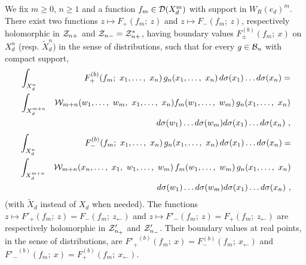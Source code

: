 \documentclass[a4paper,a4paper]{article}
\def\BB{{\cal B}}
\def\DD{{\cal D}}
\def\WW{{\cal W}}
\def\ZZ{{\cal Z}}
\def\wt{\widetilde}
\def\Xdn{X_d^n}
\def\wXdn{{\wt X_d^n}}
\begin{document}
We fix $m \ge 0$, $n \ge 1$ and a function ${f_m}\in \DD(X_d^m)$
with support in $W_R(e_d)^m$. There exist two functions
$z \mapsto F_+({f_m};\ z)$ and $z \mapsto F_-({f_m};\ z)$, respectively
holomorphic in $\ZZ_{n+}$ and $\ZZ_{n-} = \ZZ_{n+}^*$,
having boundary values
$F_{\pm}^{(b)}({f_m};\ x)$ on $\Xdn$ (resp. $\wXdn$)
in the sense of distributions, such that
for every $g \in \BB_n$ with compact support,
\begin{eqnarray}
&\displaystyle\int_{\Xdn}&
F_+^{(b)}({f_m};\ x_1,\ldots,\ x_n)\,{g_n}(x_1,\ldots,\ x_n)\,
d\sigma(x_1)\ldots d\sigma(x_n) =\nonumber\\
&\displaystyle\int_{X_d^{m+n}}&
\WW_{m+n}(w_1,\ldots,\ w_m,\ x_1,\ldots,\ x_n)
{f_m}(w_1,\ldots,\ w_m)\,{g_n}(x_1,\ldots,\ x_n)\nonumber\\
&& d\sigma(w_1)\ldots d\sigma(w_m)d\sigma(x_1)\ldots d\sigma(x_n)\ ,
\label{5.12}\end{eqnarray}
\begin{eqnarray}
&\displaystyle\int_{\Xdn}&
F_-^{(b)}({f_m};\ x_1,\ldots,\ x_n)\,{g_n}(x_1,\ldots,\ x_n)\,
d\sigma(x_1)\ldots d\sigma(x_n) =\nonumber\\
&\displaystyle\int_{X_d^{m+n}}&
\WW_{m+n}(x_n,\ldots,\ x_1,\ w_1,\ldots,\ w_m)\,
{f_m}(w_1,\ldots,\ w_m)\,{g_n}(x_1,\ldots,\ x_n)\nonumber\\
&& d\sigma(w_1)\ldots d\sigma(w_m)d\sigma(x_1)\ldots d\sigma(x_n)\ ,
\label{5.13}\end{eqnarray}
(with $\wt X_d$ instead of $X_d$ when needed).
The functions $z\mapsto F'_+(f_m;\ z) = F_-(f_m;\ z_\leftarrow)$
and $z\mapsto F'_-(f_m;\ z) = F_+(f_m;\ z_\leftarrow)$
are respectively holomorphic in $\ZZ'_{n_+}$ and $\ZZ'_{n_-}$.
Their boundary values at real points, in the sense of distributions,
are ${F'_+}^{(b)}(f_m;\ x) = F_-^{(b)}(f_m;\ x_\leftarrow)$
and ${F'_-}^{(b)}(f_m;\ x) = F_+^{(b)}(f_m;\ x_\leftarrow)$.
\end{document}
